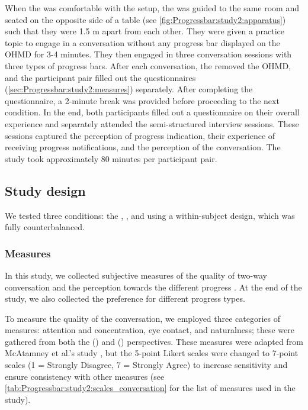 When the \receiver{} was comfortable with the setup, the \observer{} was guided to the same room and seated on the opposite side of a table (see \autoref{fig:Progressbar:study2:apparatus}) such that they were 1.5 m apart from each other. They were given a practice topic to engage in a conversation without any progress bar displayed on the OHMD for 3-4 minutes. They then engaged in three conversation sessions with three types of progress bars. After each conversation, the \receiver{} removed the OHMD, and the participant pair filled out the questionnaires (\autoref{sec:Progressbar:study2:measures}) separately. After completing the questionnaire, a 2-minute break was provided before proceeding to the next condition. In the end, both participants filled out a questionnaire on their overall experience and separately attended the semi-structured interview sessions. These sessions captured the  perception of progress indication, their experience of receiving progress notifications, and the  perception of the conversation. The study took approximately 80 minutes per participant pair.

\subsection{Study design}

We tested three conditions: the \circularbar{}, \linearbar{}, and \textbar{} using a within-subject design, which was fully counterbalanced.



\subsubsection*{Measures}
\label{sec:Progressbar:study2:measures}

In this study, we collected subjective measures of the quality of two-way conversation and the  perception towards the different progress . At the end of the study, we also collected the  preference for different progress types.

To measure the quality of the conversation, we employed three categories of measures: attention and concentration, eye contact, and naturalness; these were gathered from both the  (\prefixReceiver{}) and  (\prefixObserver{}) perspectives. These measures were adapted from McAtamney et al.'s study \cite{mcatamney_examination_2006}, but the 5-point Likert scales were changed to 7-point scales (1 = Strongly Disagree, 7 = Strongly Agree) to increase sensitivity and ensure consistency with other measures (see \autoref{tab:Progressbar:study2:scales_conversation} for the list of measures used in the study).


